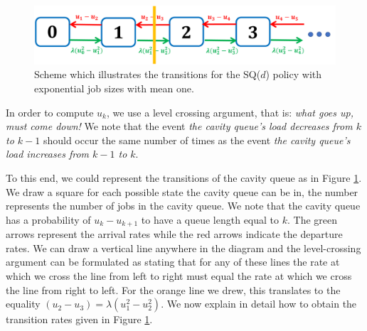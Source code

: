 \documentclass[12pt]{report}
\begin{document}
\begin{figure}
	\begin{center}
		\includegraphics[scale=0.4]{figures/Chapter1/SQd_schema.PNG}
	\end{center}
	\caption{Scheme which illustrates the transitions for the SQ($d$) policy with exponential job sizes with mean one.} \label{fig:scheme_SQd}
\end{figure}
In order to compute $u_k$, we use a level crossing argument, that is: \textit{what goes up, must come down!} We note that the event \textit{the cavity queue's load decreases from $k$ to $k-1$} should occur the same number of times as the event \textit{the cavity queue's load increases from $k-1$ to $k$}.

To this end, we could represent the transitions of the cavity queue as in Figure \ref{fig:scheme_SQd}. We draw a square for each possible state the cavity queue can be in, the number represents the number of jobs in the cavity queue. We note that the cavity queue has a probability of $u_k - u_{k+1}$ to have a queue length equal to $k$. The green arrows represent the arrival rates while the red arrows indicate the departure rates. We can draw a vertical line anywhere in the diagram and the level-crossing argument can be formulated as stating that for any of these lines the rate at which we cross the line from left to right must equal the rate at which we cross the line from right to left. For the orange line we drew, this translates to the equality $(u_2 - u_3) = \lambda (u_1^2 - u_2^2)$. We now explain in detail how to obtain the transition rates given in Figure \ref{fig:scheme_SQd}.
\end{document}
